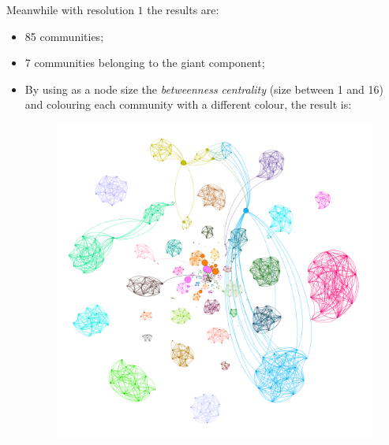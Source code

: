 \documentclass{article}
\begin{document}
        \par\noindent Meanwhile with resolution \(1\) the results are:
        \begin{itemize}
            \item 85 communities;
            \item 7 communities belonging to the giant component;
            \item By using as a node size the \textit{betweenness centrality} (size between 1 and 16) and colouring each community with a different colour, the result is:
            \begin{figure}[H]
                \centering
             \includegraphics[width=1\textwidth]{3.2.png}
                \caption{}
                \label{fig:figure-3.2}
            \end{figure}
        \end{itemize}
        
\end{document}
